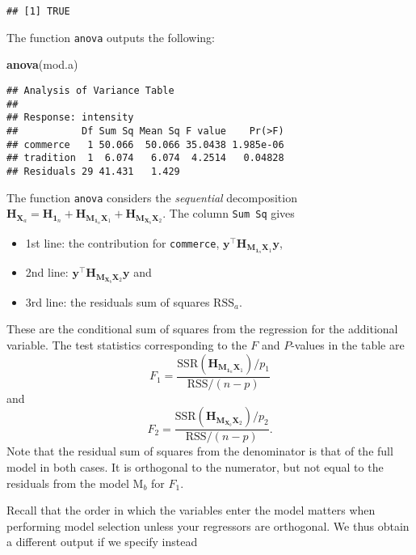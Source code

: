 \documentclass[]{book}
\newenvironment{Shaded}{\begin{snugshade}}{\end{snugshade}}
\newcommand{\KeywordTok}[1]{\textcolor[rgb]{0.13,0.29,0.53}{\textbf{#1}}}
\newcommand{\NormalTok}[1]{#1}
\providecommand{\tightlist}{%
  \setlength{\itemsep}{0pt}\setlength{\parskip}{0pt}}
\theoremstyle{definition}
\theoremstyle{definition}
\theoremstyle{definition}
\theoremstyle{remark}
\begin{document}
\begin{verbatim}
## [1] TRUE
\end{verbatim}

The function \texttt{anova} outputs the following:

\begin{Shaded}
\begin{Highlighting}[]
\KeywordTok{anova}\NormalTok{(mod.a)}
\end{Highlighting}
\end{Shaded}

\begin{verbatim}
## Analysis of Variance Table
## 
## Response: intensity
##           Df Sum Sq Mean Sq F value    Pr(>F)
## commerce   1 50.066  50.066 35.0438 1.985e-06
## tradition  1  6.074   6.074  4.2514   0.04828
## Residuals 29 41.431   1.429
\end{verbatim}

The function \texttt{anova} considers the \emph{sequential}
decomposition
\(\mathbf{H}_{\mathbf{X}_a}=\mathbf{H}_{\mathbf{1}_n} + \mathbf{H}_{\mathbf{M}_{\mathbf{1}_n}\mathbf{X}_1} + \mathbf{H}_{\mathbf{M}_{\mathbf{X}_b}\mathbf{X}_2}\).
The column \texttt{Sum\ Sq} gives

\begin{itemize}
\tightlist
\item
  1st line: the contribution for \texttt{commerce},
  \(\boldsymbol{y}^\top\mathbf{H}_{\mathbf{M}_{\mathbf{1}_n}\mathbf{X}_1}\boldsymbol{y}\),
\item
  2nd line:
  \(\boldsymbol{y}^\top\mathbf{H}_{\mathbf{M}_{\mathbf{X}_b}\mathbf{X}_2}\boldsymbol{y}\)
  and
\item
  3rd line: the residuals sum of squares \(\mathrm{RSS}_a\).
\end{itemize}

These are the conditional sum of squares from the regression for the
additional variable. The test statistics corresponding to the \(F\) and
\(P\)-values in the table are
\[F_1 = \frac{\mathrm{SSR}(\mathbf{H}_{\mathbf{M}_{\mathbf{1}_n}\mathbf{X}_1})/p_1}{\mathrm{RSS}/(n-p)}\]
and
\[F_2 = \frac{\mathrm{SSR}(\mathbf{H}_{\mathbf{M}_{\mathbf{X}_b}\mathbf{X}_2})/p_2}{\mathrm{RSS}/(n-p)}.\]
Note that the residual sum of squares from the denominator is that of
the full model in both cases. It is orthogonal to the numerator, but not
equal to the residuals from the model \(\mathrm{M}_b\) for \(F_1\).

Recall that the order in which the variables enter the model matters
when performing model selection unless your regressors are orthogonal.
We thus obtain a different output if we specify instead
\end{document}
